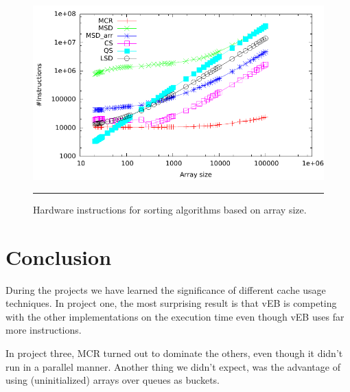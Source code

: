 \begin{figure}[htbp]
	\centering
		\includegraphics[width=\textwidth]{./Figures/Project2b/Instructions.pdf}
		\rule{35em}{0.5pt}
	\caption[Instructions]{
	Hardware instructions for sorting algorithms based on array size.
	}
	\label{fig:Instructions_p2b}
\end{figure}



\section{Conclusion}
During the projects we have learned the significance of different cache usage techniques.
In project one, the most surprising result is that vEB is competing with the other implementations on the execution time even though vEB uses far more instructions.

In project three, MCR turned out to dominate the others, even though it didn't run in a parallel manner. 
Another thing we didn't expect, was the advantage of using (uninitialized) arrays over queues as buckets.

